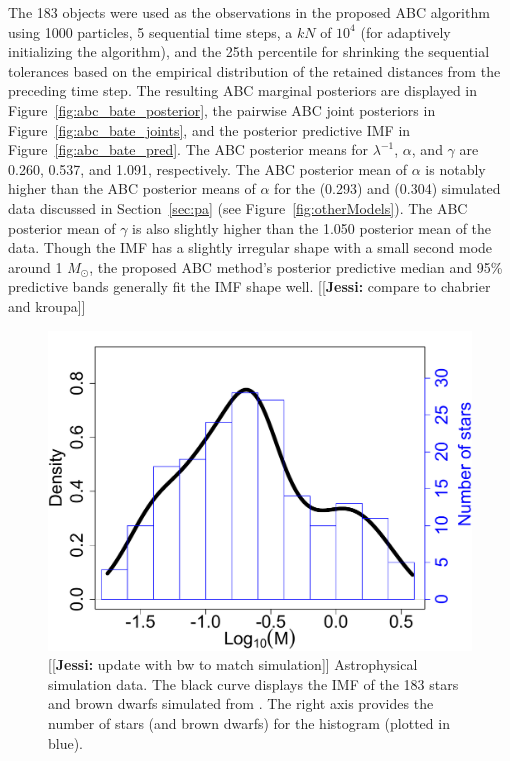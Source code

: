 \documentclass[12pt]{article}
\newcommand{\jessi}[1]{{\color{blue}[[\textbf{Jessi: }#1]]}}
\newcommand{\Msun}{M_{\odot}}
\begin{document}
The 183 objects were used as the observations in the proposed ABC algorithm using 1000 particles, 5 sequential time steps, a $kN$ of $10^4$ (for adaptively initializing the algorithm), and the 25th percentile for shrinking the sequential tolerances based on the empirical distribution of the retained distances from the preceding time step.  The resulting ABC marginal posteriors are displayed in Figure~\ref{fig:abc_bate_posterior}, the pairwise ABC joint posteriors in Figure~\ref{fig:abc_bate_joints}, and the posterior predictive IMF in Figure~\ref{fig:abc_bate_pred}.
The ABC posterior means for $\lambda^{-1}$, $\alpha$, and $\gamma$ are 0.260, 0.537, and 1.091, respectively.  The ABC posterior mean of $\alpha$ is notably higher than the ABC posterior means of $\alpha$ for the \cite{kroupa2001} (0.293) and \cite{Chabrier:2003om, Chabrier:2003oq} (0.304) simulated data discussed in Section~\ref{sec:pa} (see Figure~\ref{fig:otherModels}).  The ABC posterior mean of $\gamma$ is also slightly higher than the 1.050 posterior mean of the \cite{Chabrier:2003om, Chabrier:2003oq} data.
%
Though the IMF has a slightly irregular shape with a small second mode around 1 $\Msun$, the proposed ABC method's  posterior predictive median and 
95\% predictive bands generally fit the IMF shape well.
\jessi{compare to chabrier and kroupa}


\begin{figure}[htbp]
\centering
\includegraphics[width = .5\textwidth]{figures/bate_imf.pdf} 
\caption{\jessi{update with bw to match simulation} Astrophysical simulation data.  The black curve displays the IMF of the 183 stars and brown dwarfs simulated from \cite{Bate2012}.  The right axis provides the number of stars (and brown dwarfs) for the histogram (plotted in blue).
   }
   \label{fig:bate1}
\end{figure}
\end{document}
